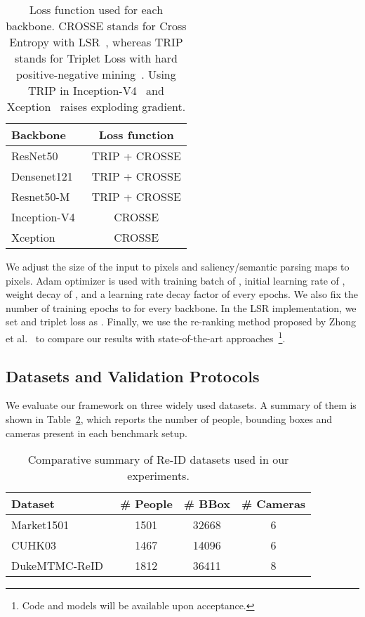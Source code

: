 \documentclass[final,3p,times,twocolumn]{elsarticle}
\begin{document}
\begin{table}[!htb]
\centering
\renewcommand{\tabcolsep}{2.5mm}
\renewcommand{\arraystretch}{1.1}
\caption{Loss function used for each backbone. CROSSE stands for Cross Entropy with LSR~\cite{szegedy2016rethinking}, whereas TRIP stands for Triplet Loss with hard positive-negative mining~\cite{hermans2017defense}. Using TRIP in Inception-V4~\cite{szegedy2017inception} and Xception~\cite{chollet2016xception} raises exploding gradient.}
\label{table:backbones-loss-intermediate-layer}
\small
\begin{tabular}{lc}
\toprule
\textbf{Backbone} &\textbf{Loss function} \\
\midrule
ResNet50~\cite{he2016deep}               & TRIP + CROSSE \\
Densenet121~\cite{huang2017densely}      & TRIP + CROSSE \\
Resnet50-M~\cite{yu2017devil}            & TRIP + CROSSE \\
Inception-V4~\cite{szegedy2017inception} & CROSSE \\
Xception~\cite{chollet2016xception}      & CROSSE \\
\bottomrule
\end{tabular}
\end{table}

We adjust the size of the input to  pixels and saliency/semantic parsing maps to  pixels. Adam optimizer is used with training batch of , initial learning rate of , weight decay of , and a learning rate decay factor of  every  epochs. We also fix the number of training epochs to  for every backbone. In the LSR implementation, we set  and triplet loss as . Finally, we use the re-ranking method proposed by Zhong et al.~\cite{zhong2017re} to compare our results with state-of-the-art approaches~\footnote{Code and models will be available upon acceptance.}.

\subsection{Datasets and Validation Protocols}

We evaluate our framework on three widely used datasets. A summary of them is shown in Table~\ref{table:datasets}, which reports the number of people, bounding boxes and cameras present in each benchmark setup.

\begin{table}[!htb]
\small
\setlength{\tabcolsep}{1.4mm}
\renewcommand{\arraystretch}{1.1}
\centering
\caption{Comparative summary of Re-ID datasets used in our experiments.}
\begin{tabular}{lccc}
\toprule
\textbf{Dataset} & \# \textbf{People} & \# \textbf{BBox} & \# \textbf{Cameras} \\
\midrule
Market1501~\cite{zheng2015scalable}     & 1501 & 32668 & 6 \\
CUHK03~\cite{li2014deepreid}            & 1467 & 14096 & 6 \\
DukeMTMC-ReID~\cite{zheng2017unlabeled} & 1812 & 36411 & 8 \\
\bottomrule
\end{tabular}
\label{table:datasets}
\end{table}
\end{document}
